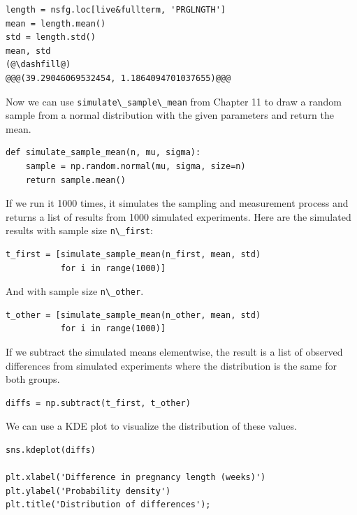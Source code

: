 \begin{lstlisting}[]
length = nsfg.loc[live&fullterm, 'PRGLNGTH']
mean = length.mean()
std = length.std()
mean, std
(@\dashfill@)
@@@(39.29046069532454, 1.1864094701037655)@@@
\end{lstlisting}

Now we can use \passthrough{\lstinline!simulate\_sample\_mean!} from
Chapter 11 to draw a random sample from a normal distribution with the
given parameters and return the mean.

\begin{lstlisting}[]
def simulate_sample_mean(n, mu, sigma):
    sample = np.random.normal(mu, sigma, size=n)
    return sample.mean()
\end{lstlisting}

If we run it 1000 times, it simulates the sampling and measurement
process and returns a list of results from 1000 simulated experiments.
Here are the simulated results with sample size
\passthrough{\lstinline!n\_first!}:

\begin{lstlisting}[]
t_first = [simulate_sample_mean(n_first, mean, std)
           for i in range(1000)]
\end{lstlisting}

And with sample size \passthrough{\lstinline!n\_other!}.

\begin{lstlisting}[]
t_other = [simulate_sample_mean(n_other, mean, std)
           for i in range(1000)]
\end{lstlisting}

If we subtract the simulated means elementwise, the result is a list of
observed differences from simulated experiments where the distribution
is the same for both groups.

\begin{lstlisting}[]
diffs = np.subtract(t_first, t_other)
\end{lstlisting}

We can use a KDE plot to visualize the distribution of these values.

\begin{lstlisting}[]
sns.kdeplot(diffs)

plt.xlabel('Difference in pregnancy length (weeks)')
plt.ylabel('Probability density')
plt.title('Distribution of differences');
\end{lstlisting}

